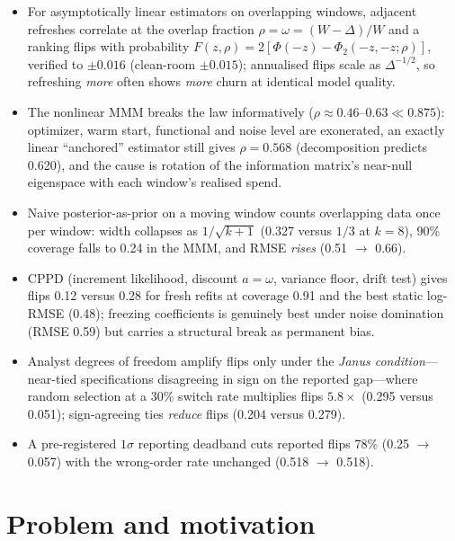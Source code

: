 \begin{keyideas}
\begin{itemize}
\item For asymptotically linear estimators on overlapping windows, adjacent refreshes correlate at the overlap fraction $\rho = \omega = (W-\Delta)/W$ and a ranking flips with probability $F(z,\rho) = 2[\Phi(-z) - \Phi_2(-z,-z;\rho)]$, verified to $\pm 0.016$ (clean-room $\pm 0.015$); annualised flips scale as $\Delta^{-1/2}$, so refreshing \emph{more} often shows \emph{more} churn at identical model quality.
\item The nonlinear MMM breaks the law informatively ($\rho \approx 0.46$--$0.63 \ll 0.875$): optimizer, warm start, functional and noise level are exonerated, an exactly linear ``anchored'' estimator still gives $\rho = 0.568$ (decomposition predicts 0.620), and the cause is rotation of the information matrix's near-null eigenspace with each window's realised spend.
\item Naive posterior-as-prior on a moving window counts overlapping data once per window: width collapses as $1/\sqrt{k+1}$ (0.327 versus $1/3$ at $k = 8$), 90\% coverage falls to 0.24 in the MMM, and RMSE \emph{rises} (0.51 $\to$ 0.66).
\item CPPD (increment likelihood, discount $a = \omega$, variance floor, drift test) gives flips 0.12 versus 0.28 for fresh refits at coverage 0.91 and the best static log-RMSE (0.48); freezing coefficients is genuinely best under noise domination (RMSE 0.59) but carries a structural break as permanent bias.
\item Analyst degrees of freedom amplify flips only under the \emph{Janus condition}---near-tied specifications disagreeing in sign on the reported gap---where random selection at a 30\% switch rate multiplies flips $5.8\times$ (0.295 versus 0.051); sign-agreeing ties \emph{reduce} flips (0.204 versus 0.279).
\item A pre-registered $1\sigma$ reporting deadband cuts reported flips 78\% (0.25 $\to$ 0.057) with the wrong-order rate unchanged (0.518 $\to$ 0.518).
\end{itemize}
\end{keyideas}

\section{Problem and motivation}

